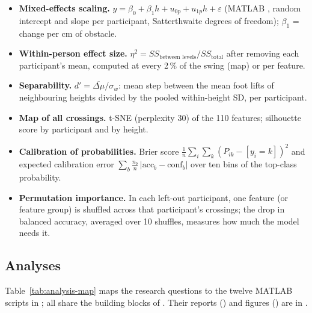 \begin{itemize}
  \item \textbf{Mixed-effects scaling.} $y = \beta_0 + \beta_1 h + u_{0p} + u_{1p} h + \varepsilon$ (MATLAB ,
  random intercept and slope per participant, Satterthwaite degrees of freedom); $\beta_1$ = change per cm of obstacle.
  \item \textbf{Within-person effect size.} $\eta^2 = SS_{\text{between levels}} / SS_{\text{total}}$ after removing each
  participant's mean, computed at every 2\,\% of the swing (map) or per feature.
  \item \textbf{Separability.} $d' = \overline{\Delta\mu}/\sigma_w$: mean step between the mean foot lifts of neighbouring
  heights divided by the pooled within-height SD, per participant.
  \item \textbf{Map of all crossings.} t-SNE (perplexity 30) of the 110 features; silhouette score by participant and by
  height.
  \item \textbf{Calibration of probabilities.} Brier score $\frac1n\sum_i\sum_k (P_{ik} - [y_i = k])^2$ and expected calibration
  error $\sum_b \frac{n_b}{n}\,\lvert \mathrm{acc}_b - \mathrm{conf}_b\rvert$ over ten bins of the top-class probability.
  \item \textbf{Permutation importance.} In each left-out participant, one feature (or feature group) is shuffled across
  that participant's crossings; the drop in balanced accuracy, averaged over 10 shuffles, measures how much the model
  needs it.
\end{itemize}

\subsection{Analyses}
\label{sec:analyses}

Table~\ref{tab:analysis-map} maps the research questions to the twelve MATLAB scripts in ; all share the
building blocks of . Their reports () and figures () are in
.

